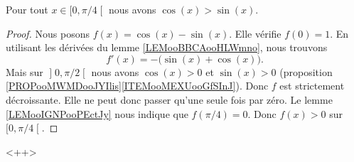 \begin{proposition}     \label{PROPooJFAGooYjRJcb}
    Pour tout \( x\in \mathopen[ 0 , \pi/4 \mathclose[\) nous avons \( \cos(x)>\sin(x)\).
\end{proposition}

\begin{proof}
    Nous posons \( f(x)=\cos(x)-\sin(x)\). Elle vérifie \( f(0)=1\). En utilisant les dérivées du lemme \ref{LEMooBBCAooHLWmno}, nous trouvons
    \begin{equation}
        f'(x)=-\big( \sin(x)+\cos(x) \big).
    \end{equation}
Mais sur \( \mathopen] 0 , \pi/2 \mathclose[\) nous avons \( \cos(x)>0\) et \( \sin(x)>0\) (proposition \ref{PROPooMWMDooJYIlis}\ref{ITEMooMEXUooGfSInJ}). Donc \( f\) est strictement décroissante. Elle ne peut donc passer qu'une seule fois par zéro. Le lemme \ref{LEMooIGNPooPEctJy} nous indique que \( f(\pi/4)=0\). Donc \( f(x)>0\) sur \( \mathopen[ 0 , \pi/4 \mathclose[\).
\end{proof}
<++>

